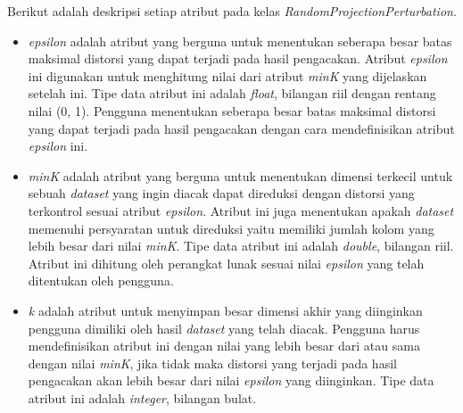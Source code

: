 Berikut adalah deskripsi setiap atribut pada kelas \textit{RandomProjectionPerturbation}.
\begin{itemize}
	\item \textit{epsilon} adalah atribut yang berguna untuk menentukan seberapa besar batas maksimal distorsi yang dapat terjadi pada hasil pengacakan. Atribut \textit{epsilon} ini digunakan untuk menghitung nilai dari atribut \textit{minK} yang dijelaskan setelah ini. Tipe data atribut ini adalah \textit{float}, bilangan riil dengan rentang nilai (0, 1). Pengguna menentukan seberapa besar batas maksimal distorsi yang dapat terjadi pada hasil pengacakan dengan cara mendefinisikan atribut \textit{epsilon} ini.
	\item \textit{minK} adalah atribut yang berguna untuk menentukan dimensi terkecil untuk sebuah \textit{dataset} yang ingin diacak dapat direduksi dengan distorsi yang terkontrol sesuai atribut \textit{epsilon}. Atribut ini juga menentukan apakah \textit{dataset} memenuhi persyaratan untuk direduksi yaitu memiliki jumlah kolom yang lebih besar dari nilai \textit{minK}. Tipe data atribut ini adalah \textit{double}, bilangan riil. Atribut ini dihitung oleh perangkat lunak sesuai nilai \textit{epsilon} yang telah ditentukan oleh pengguna.
	\item \textit{k} adalah atribut untuk menyimpan besar dimensi akhir yang diinginkan pengguna dimiliki oleh hasil \textit{dataset} yang telah diacak. Pengguna harus mendefinisikan atribut ini dengan nilai yang lebih besar dari atau sama dengan nilai \textit{minK}, jika tidak maka distorsi yang terjadi pada hasil pengacakan akan lebih besar dari nilai \textit{epsilon} yang diinginkan. Tipe data atribut ini adalah \textit{integer}, bilangan bulat.
\end{itemize}


